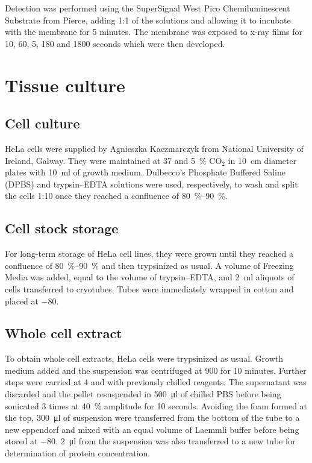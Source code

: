       Detection was performed using the SuperSignal West Pico Chemiluminescent
      Substrate from Pierce, adding 1:1 of the solutions and allowing it to incubate
      with the membrane for 5 minutes. The membrane was exposed to x-ray films for
      10, 60, 5, 180 and 1800 seconds which were then developed.


\section{Tissue culture}
  \subsection{Cell culture}
    HeLa cells were supplied by Agnieszka Kaczmarczyk from National University
    of Ireland, Galway. They were maintained at \SI{37}{\dc} and \SI{5}{\percent} CO$_2$ in \SI{10}{\cm}
    diameter plates with \SI{10}{\ml} of growth medium. Dulbecco's Phosphate Buffered
    Saline (DPBS) and trypsin--EDTA solutions were used, respectively, to wash
    and split the cells 1:10 once they reached a confluence of \SIrange{80}{90}{\percent}.

  \subsection{Cell stock storage}
    For long-term storage of HeLa cell lines, they were grown until they reached
    a confluence of \SIrange{80}{90}{\percent} and then trypsinized as usual. A volume of Freezing
    Media was added, equal to the volume of trypsin--EDTA, and \SI{2}{\ml} aliquots of
    cells transferred to cryotubes. Tubes were immediately wrapped in cotton and
    placed at \SI{-80}{\dc}.

  \subsection{Whole cell extract}
    \label{sec:cell-extract}
    To obtain whole cell extracts, HeLa cells were trypsinized as usual. Growth
    medium added and the suspension was centrifuged at \SI{900}{\gn} for 10 minutes. Further
    steps were carried at \SI{4}{\dc} and with previously chilled reagents. The supernatant
    was discarded and the pellet resuspended in \SI{500}{\ul} of chilled PBS before being
    sonicated 3 times at \SI{40}{\percent} amplitude for 10 seconds. Avoiding the foam formed at
    the top, \SI{300}{\ul} of suspension were transferred from the bottom of the tube to a
    new eppendorf and mixed with an equal volume of Laemmli buffer before being
    stored at \SI{-80}{\dc}. \SI{2}{\ul} from the suspension was also transferred to a new tube
    for determination of protein concentration.

